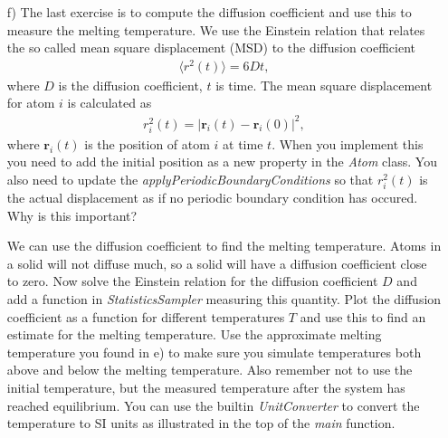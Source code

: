 \documentclass[a4wide,12pt]{article}
\renewcommand{\vec}{\mathbf}
\begin{document}
\begin{enumerate}
\item[f)]
The last exercise is to compute the diffusion coefficient and use this to measure the melting temperature. We use the Einstein relation that relates the so called mean square displacement (MSD) to the diffusion coefficient
\begin{align}
	\langle r^2(t) \rangle = 6Dt,
\end{align}
where $D$ is the diffusion coefficient, $t$ is time. The mean square displacement for atom $i$ is calculated as
\begin{align}
	r_i^2(t) = |\vec r_i(t) - \vec r_i(0)|^2,
\end{align}
where $\vec r_i(t)$ is the position of atom $i$ at time $t$. When you implement this you need to add the initial position as a new property in the \textit{Atom} class. You also need to update the \textit{applyPeriodicBoundaryConditions} so that $r_i^2(t)$ is the actual displacement as if no periodic boundary condition has occured. Why is this important?

We can use the diffusion coefficient to find the melting temperature. Atoms in a solid will not diffuse much, so a solid will have a diffusion coefficient close to zero. Now solve the Einstein relation for the diffusion coefficient $D$ and add a function in \textit{StatisticsSampler} measuring this quantity. Plot the diffusion coefficient as a function for different temperatures $T$ and use this to find an estimate for the melting temperature. Use the approximate melting temperature you found in e) to make sure you simulate temperatures both above and below the melting temperature. Also remember not to use the initial temperature, but the measured temperature after the system has reached equilibrium. You can use the builtin \textit{UnitConverter} to convert the temperature to SI units as illustrated in the top of the \textit{main} function. 

\end{enumerate}
\end{document}
